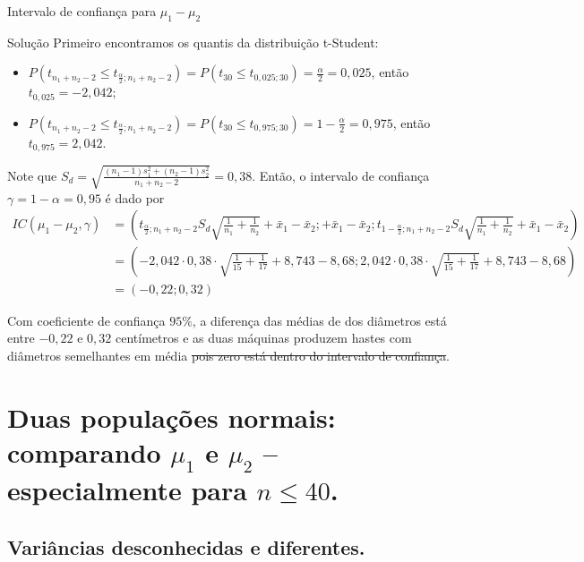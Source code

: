 \documentclass[9pt]{beamer}
\begin{document}
\begin{frame}{Intervalo de confiança para $\mu_1 - \mu_2$}

\small
\begin{block}{Solução}
	Primeiro encontramos os quantis da distribuição t-Student:
	\begin{itemize}
		\item $P(t_{n_1+n_2-2} \leq t_{\frac{\alpha}{2}; n_1+n_2-2}) = P(t_{30} \leq t_{0,025; 30}) = \frac{\alpha}{2} = 0,025$, então $t_{0,025} =-2,042$;
		\item $P(t_{n_1+n_2-2} \leq t_{\frac{\alpha}{2}; n_1+n_2-2}) = P(t_{30} \leq t_{0,975; 30}) =1- \frac{\alpha}{2} = 0,975$, então $t_{0,975} =2,042$.
	\end{itemize}	

	Note que $S_d =\sqrt{ \frac{(n_1 - 1) s_1^2 + (n_2 -1)s_2^2}{n_1+n_2-2}} = 0,38$. Então, o intervalo de confiança $\gamma=1-\alpha = 0,95$ é dado por
	{\scriptsize
	\begin{align*}
		IC(\mu_1 - \mu_2, \gamma) &= \left( t_{\frac{\alpha}{2};n_1+n_2-2} S_d \sqrt{\frac{1}{n_1} + \frac{1}{n_2}}   + \bar{x}_1- \bar{x}_2; + \bar{x}_1- \bar{x}_2; t_{1-\frac{\alpha}{2};n_1+n_2-2} S_d \sqrt{\frac{1}{n_1} + \frac{1}{n_2}} + \bar{x}_1- \bar{x}_2  \right)\\
		&= \left( -2,042\cdot 0,38\cdot \sqrt{\frac{1}{15} + \frac{1}{17}} + 8,743 - 8,68; 2,042\cdot 0,38\cdot \sqrt{\frac{1}{15} + \frac{1}{17}} + 8,743 - 8,68  \right)\\
		&= \left( -0,22; 0,32 \right)
	\end{align*}
	}

	Com coeficiente de confiança $95\%$, a diferença das médias de dos diâmetros está entre $-0,22$ e $0,32$ centímetros e as duas máquinas produzem hastes com diâmetros semelhantes em média \sout{pois zero está dentro do intervalo de confiança}.
\end{block}
\normalsize

\end{frame}

\section{Duas populações normais: comparando $\mu_1$ e $\mu_2$ -- especialmente para $n \leq 40$.}

\subsection{Variâncias desconhecidas e diferentes.}
\end{document}
